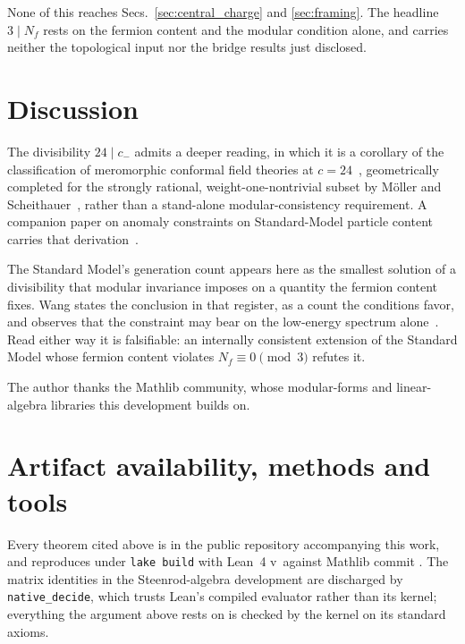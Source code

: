 \documentclass[aps,prl,twocolumn,superscriptaddress,nofootinbib]{revtex4-2}
\newcommand{\mathlibcommit}{\mathlibrev}
\begin{document}
None of this reaches Secs.~\ref{sec:central_charge} and
\ref{sec:framing}. The headline $3 \mid N_f$ rests on the fermion
content and the modular condition alone, and carries neither the
topological input nor the bridge results just disclosed.

\section{Discussion}

The divisibility $24 \mid c_-$ admits a deeper reading, in which
it is a corollary of the classification of meromorphic conformal field
theories at $c = 24$~\cite{Schellekens1993}, geometrically completed
for the strongly rational, weight-one-nontrivial subset by
M\"oller and Scheithauer~\cite{MollerScheithauer2024}, rather than a
stand-alone modular-consistency requirement. A companion paper on
anomaly constraints on Standard-Model particle content carries that
derivation~\cite{Roehm2026D2}.

The Standard Model's generation count appears here as the smallest
solution of a divisibility that modular invariance imposes on a
quantity the fermion content fixes. Wang states the conclusion in that
register, as a count the conditions favor, and observes that the
constraint may bear on the low-energy spectrum
alone~\cite[Sec.~IV]{Wang2024}. Read either way it is falsifiable: an
internally consistent extension of the Standard Model whose fermion
content violates $N_f \equiv 0 \pmod 3$ refutes it.

\begin{acknowledgments}
The author thanks the Mathlib community, whose modular-forms and
linear-algebra libraries this development builds on.
\end{acknowledgments}

\section*{Artifact availability, methods and tools}
Every theorem cited above is in the public repository accompanying this
work, and reproduces under \texttt{lake build} with Lean~4
v\leantoolchain\ against Mathlib commit \texttt{\mathlibcommit{}}. The
matrix identities in the Steenrod-algebra development are discharged by
\texttt{native\_decide}, which trusts Lean's compiled evaluator rather
than its kernel; everything the argument above rests on is checked by
the kernel on its standard axioms.
\end{document}
